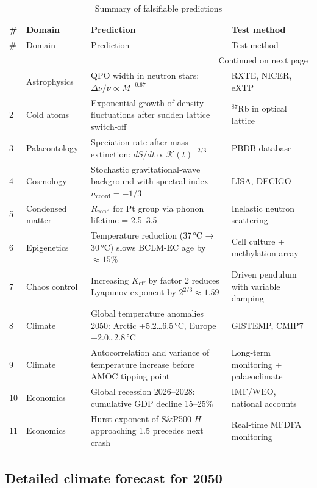 \documentclass[12pt,a4paper]{article}
\newcommand{\Keff}{K_{\mathrm{eff}}}
\newcommand{\REL}{\mathcal{K}}
\begin{document}
	\begin{longtable}{|p{2cm}|p{3cm}|p{4.5cm}|p{4cm}|}
		\caption{Summary of falsifiable predictions}\label{tab:predictions}\\
		\hline
		\textbf{\#} & \textbf{Domain} & \textbf{Prediction} & \textbf{Test method} \\
		\hline
		\endfirsthead
		\hline
		\# & Domain & Prediction & Test method \\
		\hline
		\endhead
		\hline
		\multicolumn{4}{r}{Continued on next page} \\
		\endfoot
		\hline
		\endlastfoot
		1 & Astrophysics & QPO width in neutron stars: $\Delta\nu/\nu \propto M^{-0.67}$ & RXTE, NICER, eXTP \\
		2 & Cold atoms & Exponential growth of density fluctuations after sudden lattice switch‑off & ${}^{87}$Rb in optical lattice \\
		3 & Palaeontology & Speciation rate after mass extinction: $dS/dt \propto \REL(t)^{-2/3}$ & PBDB database \\
		4 & Cosmology & Stochastic gravitational‑wave background with spectral index $n_{\mathrm{coord}} = -1/3$ & LISA, DECIGO \\
		5 & Condensed matter & $R_{\text{cond}}$ for Pt group via phonon lifetime = 2.5–3.5 & Inelastic neutron scattering \\
		6 & Epigenetics & Temperature reduction (37 °C → 30 °C) slows BCLM‑EC age by $\approx 15\%$ & Cell culture + methylation array \\
		7 & Chaos control & Increasing $\Keff$ by factor 2 reduces Lyapunov exponent by $2^{2/3} \approx 1.59$ & Driven pendulum with variable damping \\
		8 & Climate & Global temperature anomalies 2050: Arctic +5.2…6.5 °C, Europe +2.0…2.8 °C & GISTEMP, CMIP7 \\
		9 & Climate & Autocorrelation and variance of temperature increase before AMOC tipping point & Long‑term monitoring + palaeoclimate \\
		10 & Economics & Global recession 2026–2028: cumulative GDP decline 15–25\% & IMF/WEO, national accounts \\
		11 & Economics & Hurst exponent of S\&P500 $H$ approaching 1.5 precedes next crash & Real‑time MFDFA monitoring \\
	\end{longtable}
	
	\subsection{Detailed climate forecast for 2050}
	
\end{document}
